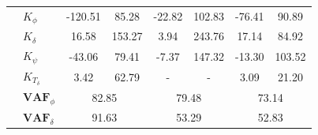 \begin{table}[]
\begin{tabular}{llcccccc}
                                                   & $K_{\phi} $                                            & -120.51                                     & 85.28                                                & -22.82                                      & 102.83                                               & -76.41                                      & 90.89                                                \\
                                                   & $K_\delta $                                            & 16.58                                       & 153.27                                               & 3.94                                        & 243.76                                               & 17.14                                       & 84.92                                                \\
                                                   & $K_\psi $                                              & -43.06                                      & 79.41                                                & -7.37                                       & 147.32                                               & -13.30                                      & 103.52                                               \\
                                                   & $K_{T_\delta}$                                         & 3.42                                        & 62.79                                                & -                                           & -                                                    & 3.09                                        & 21.20                                                \\ \cline{2-8} 
                                                   & $\mathbf{VAF}_\phi$                                    & \multicolumn{2}{c}{82.85}                                                                          & \multicolumn{2}{c}{79.48}                                                                          & \multicolumn{2}{c}{73.14}                                                                          \\
                                                   & $\mathbf{VAF}_\delta$                                  & \multicolumn{2}{c}{91.63}                                                                          & \multicolumn{2}{c}{53.29}                                                                          & \multicolumn{2}{c}{52.83}                                                                          \\

\end{tabular}
\end{table}
